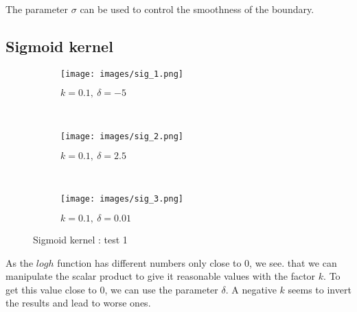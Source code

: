 \documentclass{article}
\begin{document}
The parameter $\sigma$ can be used to control the smoothness of the boundary.

\newpage
\subsection{Sigmoid kernel}
\begin{figure}[!h]
    \centering
    \begin{subfigure}[b]{0.3\textwidth}
        \texttt{[image: images/sig\_1.png]}
        \caption{$k  = 0.1,~\delta = -5$} \label{sigmoid_1_figure_1}
    \end{subfigure}
    ~ 
    \begin{subfigure}[b]{0.3\textwidth}
       \texttt{[image: images/sig\_2.png]}
        \caption{$k  = 0.1,~\delta = 2.5$}  \label{sigmoid_1_figure_2}
    \end{subfigure}
     ~ 
    \begin{subfigure}[b]{0.3\textwidth}
         \texttt{[image: images/sig\_3.png]}
        \caption{$k  = 0.1,~\delta = 0.01$}  \label{sigmoid_1_figure_3}
    \end{subfigure}
    \caption{Sigmoid kernel : test 1}
    \label{rbf_1}
\end{figure}



As the $logh$ function has different numbers only close to 0, we see. that we can manipulate the scalar product to give it reasonable values with the factor $k$. To get this value close to 0, we can use the parameter $\delta$. A negative $k$ seems to invert the results and lead to worse ones.

\newpage
\end{document}
